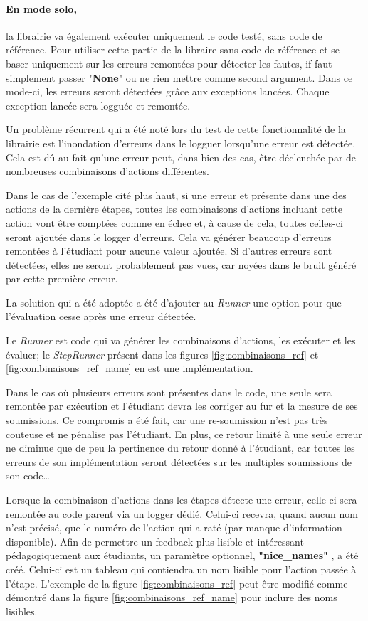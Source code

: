 \documentclass[a4paper]{report}
\begin{document}
\paragraph{En mode solo,} la librairie va également exécuter uniquement le code testé, sans code de référence.
Pour utiliser cette partie de la libraire sans code de référence et se baser uniquement sur les erreurs remontées pour détecter les fautes, if faut simplement passer "\textbf{None}" ou ne rien mettre comme second argument.
Dans ce mode-ci, les erreurs seront détectées grâce aux exceptions lancées.
Chaque exception lancée sera logguée et remontée.



Un problème récurrent qui a été noté lors du test de cette fonctionnalité de la librairie est l'inondation d'erreurs dans le logguer lorsqu’une erreur est détectée.
Cela est dû au fait qu'une erreur peut, dans bien des cas, être déclenchée par de nombreuses combinaisons d'actions différentes.

Dans le cas de l'exemple cité plus haut, si une erreur et présente dans une des actions de la dernière étapes, toutes les combinaisons d'actions incluant cette action vont être comptées comme en échec et, à cause de cela, toutes celles-ci seront ajoutée dans le logger d'erreurs.
Cela va générer beaucoup d'erreurs remontées à l'étudiant pour aucune valeur ajoutée.
Si d'autres erreurs sont détectées, elles ne seront probablement pas vues, car noyées dans le bruit généré par cette première erreur.

La solution qui a été adoptée a été d'ajouter au \textit{Runner} une option pour que l'évaluation cesse après une erreur détectée.

Le \textit{Runner} est code qui va générer les combinaisons d'actions, les exécuter et les évaluer; le \textit{StepRunner} présent dans les figures \ref{fig:combinaisons_ref} et \ref{fig:combinaisons_ref_name} en est une implémentation.

Dans le cas où plusieurs erreurs sont présentes dans le code, une seule sera remontée par exécution et l'étudiant devra les corriger au fur et la mesure de ses soumissions.
Ce compromis a été fait, car une re-soumission n'est pas très couteuse et ne pénalise pas l'étudiant.
En plus, ce retour limité à une seule erreur ne diminue que de peu la pertinence du retour donné à l'étudiant, car toutes les erreurs de son implémentation seront détectées sur les multiples soumissions de son code…
  

Lorsque la combinaison d'actions dans les étapes détecte une erreur, celle-ci sera remontée au code parent via un logger dédié.
Celui-ci recevra, quand aucun nom n'est précisé, que le numéro de l'action qui a raté (par manque d'information disponible).
Afin de permettre un feedback plus lisible et intéressant pédagogiquement aux étudiants, un paramètre optionnel, \textbf{"nice\_names"} , a été créé.
Celui-ci est un tableau qui contiendra un nom lisible pour l’action passée à l'étape.
L'exemple de la figure \ref{fig:combinaisons_ref} peut être modifié comme démontré dans la figure \ref{fig:combinaisons_ref_name} pour inclure des noms lisibles.
\end{document}
